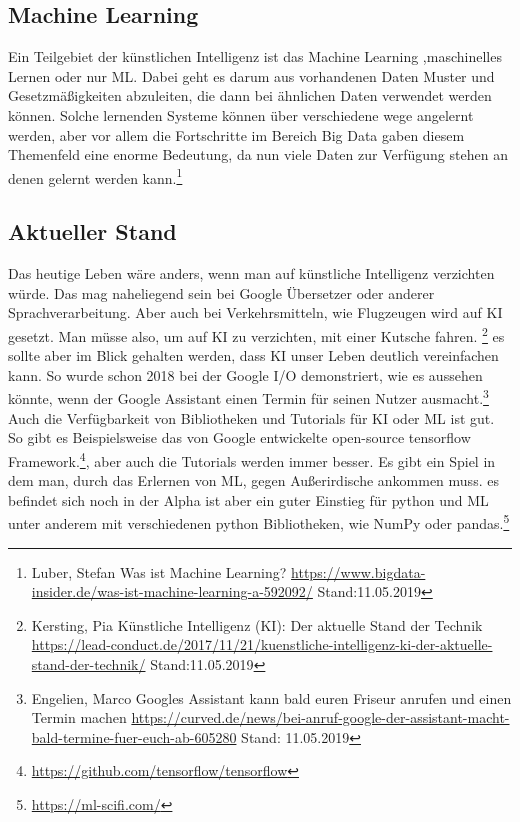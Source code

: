 \documentclass[12pt,a4paper,ngerman]{article}
\begin{document}
	\subsection{Machine Learning}
	Ein Teilgebiet der künstlichen Intelligenz ist das Machine Learning ,maschinelles Lernen oder nur ML. Dabei geht es darum aus vorhandenen Daten Muster und Gesetzmäßigkeiten abzuleiten, die dann bei ähnlichen Daten verwendet werden können. Solche lernenden Systeme können über verschiedene wege angelernt werden, aber vor allem die Fortschritte im Bereich Big Data gaben diesem Themenfeld  eine enorme Bedeutung, da nun viele Daten zur Verfügung stehen an denen gelernt werden kann.\footnote{Luber, Stefan \glqq Was ist Machine Learning? \grqq{} \url{https://www.bigdata-insider.de/was-ist-machine-learning-a-592092/} Stand:11.05.2019}
	\subsection{Aktueller Stand}
	Das heutige Leben wäre anders, wenn man auf künstliche Intelligenz verzichten würde. Das mag naheliegend sein bei Google Übersetzer oder anderer Sprachverarbeitung. Aber auch bei Verkehrsmitteln, wie Flugzeugen wird auf KI gesetzt. Man müsse also, um auf KI zu verzichten, mit einer Kutsche fahren. \footnote{Kersting, Pia \glqq Künstliche Intelligenz (KI): Der aktuelle Stand der Technik \grqq{} \url{https://lead-conduct.de/2017/11/21/kuenstliche-intelligenz-ki-der-aktuelle-stand-der-technik/} Stand:11.05.2019}
	es sollte aber im Blick gehalten werden, dass KI unser Leben deutlich vereinfachen kann. So wurde schon 2018 bei der Google I/O demonstriert, wie es aussehen könnte, wenn der Google Assistant einen Termin für seinen Nutzer ausmacht.\footnote{Engelien, Marco \glqq Googles Assistant kann bald euren Friseur anrufen und einen Termin machen \grqq{} \url{https://curved.de/news/bei-anruf-google-der-assistant-macht-bald-termine-fuer-euch-ab-605280} Stand: 11.05.2019}
	Auch die Verfügbarkeit von Bibliotheken und Tutorials für KI oder ML ist gut. So gibt es Beispielsweise das von Google entwickelte open-source tensorflow Framework.\footnote{\url{https://github.com/tensorflow/tensorflow}}, aber auch die Tutorials werden immer besser. Es gibt ein Spiel in dem man, durch das Erlernen von ML, gegen Außerirdische ankommen muss. es befindet sich noch in der Alpha ist aber ein guter Einstieg für python und ML unter anderem mit verschiedenen python Bibliotheken, wie NumPy oder pandas.\footnote{\url{https://ml-scifi.com/}}
\end{document}
